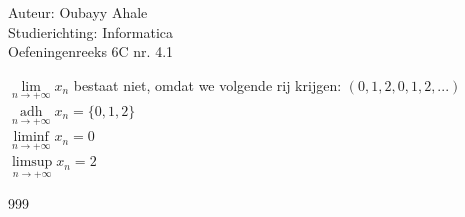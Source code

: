 \documentclass[a4paper]{article}
\DeclareMathOperator*{\adh}{adh}
\newcommand{\llim}{\lim\limits}
\newcommand{\adhl}{\adh\limits}
\newcommand{\llimsup}{\limsup\limits}
\newcommand{\lliminf}{\liminf\limits}
\begin{document}
  
\noindent \large Auteur: Oubayy Ahale        \\
\noindent \large Studierichting: Informatica \\
\noindent \large Oefeningenreeks 6C nr. 4.1  \\

\medskip

\normalsize

$ \llim_{n \to +\infty} x_n $ bestaat niet, omdat we volgende rij krijgen: $ (0, 1, 2, 0, 1, 2, ...) $\\

$ \adhl_{n \to +\infty} x_n = \{0, 1, 2\} $\\

$ \lliminf_{n \to +\infty} x_n = 0        $\\

$ \llimsup_{n \to +\infty} x_n = 2        $\\

\begin{thebibliography}{999}
\end{thebibliography}
\end{document}
